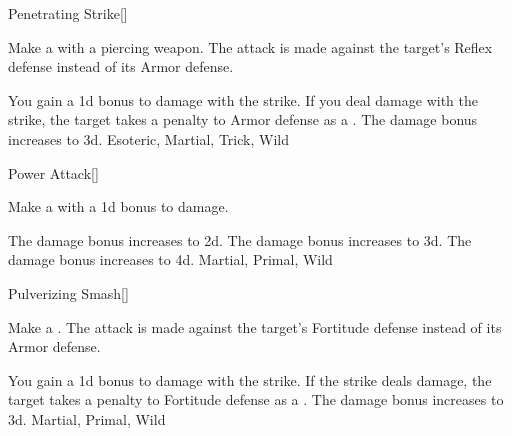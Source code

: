 \lowercase{\hypertarget{maneuver:Penetrating Strike}{}}\label{maneuver:Penetrating Strike}
\hypertarget{maneuver:Penetrating Strike}{}
\begin{freeability}[Rank 1]{Penetrating Strike}[]

Make a  with a piercing weapon.
The attack is made against the target's Reflex defense instead of its Armor defense.

\rankline
{} You gain a \plus1d bonus to damage with the strike.
 If you deal damage with the strike, the target takes a  penalty to Armor defense as a .
 The damage bonus increases to \plus3d.
 Esoteric, Martial, Trick, Wild
\end{freeability}
\vspace{0.25em}



\lowercase{\hypertarget{maneuver:Power Attack}{}}\label{maneuver:Power Attack}
\hypertarget{maneuver:Power Attack}{}
\begin{freeability}[Rank 1]{Power Attack}[]

Make a  with a \plus1d bonus to damage.

\rankline
{} The damage bonus increases to \plus2d.
 The damage bonus increases to \plus3d.
 The damage bonus increases to \plus4d.
 Martial, Primal, Wild
\end{freeability}
\vspace{0.25em}



\lowercase{\hypertarget{maneuver:Pulverizing Smash}{}}\label{maneuver:Pulverizing Smash}
\hypertarget{maneuver:Pulverizing Smash}{}
\begin{freeability}[Rank 1]{Pulverizing Smash}[]

Make a .
The attack is made against the target's Fortitude defense instead of its Armor defense.

\rankline
{} You gain a \plus1d bonus to damage with the strike.
 If the strike deals damage, the target takes a  penalty to Fortitude defense as a .
 The damage bonus increases to \plus3d.
 Martial, Primal, Wild
\end{freeability}
\vspace{0.25em}



